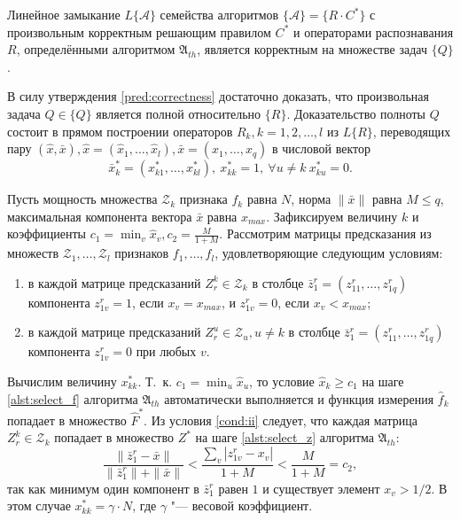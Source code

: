 \begin{Theorem}
	\label{th:correctness}
	Линейное замыкание $L\{\mathcal{A}\}$ семейства алгоритмов $\{\mathcal{A}\}=\{R{\cdot}C^*\}$ с произвольным корректным решающим правилом $C^*$ и операторами распознавания $R$, определёнными алгоритмом $\mathfrak A_{th}$, является корректным на множестве задач $\{Q\}$.
\end{Theorem}

\begin{Proof}
	В силу утверждения \ref{pred:correctness} достаточно доказать, что произвольная задача $Q\in\{Q\}$ является полной относительно $\{R\}$. Доказательство полноты $Q$ состоит в прямом построении операторов $R_k, k=1,2,\dots,l$ из $L\{R\}$, переводящих пару $(\hat{x},\bar{x}), \hat{x}=(\hat{x}_1,\dots,\hat{x}_l), \bar{x}=(x_1,\dots,x_q)$ в числовой вектор
	\begin{equation} \label{crit:fillness}
		\bar{x}_k^*=(x_{k1}^*,\dots,x_{kl}^*),\ x_{kk}^*=1,\ \forall u\neq k\ x_{ku}^*=0.
	\end{equation} 
	
	Пусть мощность множества $\mathcal Z_k$ признака $f_k$ равна $N$, норма $\|\bar x\|$ равна $M{\leqslant}q$, максимальная компонента вектора $\bar{x}$ равна $x_{max}$. Зафиксируем величину $k$ и коэффициенты $c_1=\min_v\hat x_v, c_2=\frac{M}{1+M}$. Рассмотрим матрицы предсказания из множеств $\mathcal{Z}_1,\dots,\mathcal{Z}_l$ признаков $f_1,\dots,f_l$, удовлетворяющие следующим условиям:
	
 \begin{enumerate}
	 	\item в каждой матрице предсказаний $Z_r^k\in\mathcal Z_k$ в столбце $\bar{z}_1^r=(z_{11}^r,\dots,z_{1q}^r)$ компонента $z_{1v}^r=1$, если $x_v=x_{max}$, и $z_{1v}^r=0$, если $x_v<x_{max}$; \label{cond:ii}
	 	
	 	\item в каждой матрице предсказаний $Z_r^u\in\mathcal Z_u, u\neq k$ в столбце $\bar{z}_1^r=(z_{11}^r,\dots,z_{1q}^r)$ компонента $z_{1v}^r=0$ при любых $v$. \label{cond:ij}
 \end{enumerate}
 
 Вычислим величину $x_{kk}^*$. Т.~к. $c_1=\min_u\hat x_u$, то условие $\hat x_k\geqslant c_1$ на шаге \ref{alst:select_f} алгоритма $\mathfrak A_{th}$ автоматически выполняется и функция измерения $\hat f_k$ попадает в множество $\hat F^*$. Из условия \ref{cond:ii} следует, что каждая матрица $Z_r^k\in\mathcal Z_k$ попадает в множество $Z^*$ на шаге \ref{alst:select_z} алгоритма $\mathfrak A_{th}$:
 \[
	 	\frac{\|\bar{z}_1^r-\bar{x}\|}{\|\bar{z}_1^r\|+\|\bar{x}\|}<\frac{\sum_v|z_{1v}^r-x_v|}{1+M}<\frac{M}{1+M}=c_2,
 \]
 так как минимум один компонент в $\bar{z}_1^r$ равен $1$ и существует элемент $x_v>1/2$. В этом случае $x_{kk}^*=\gamma{\cdot}N$, где $\gamma$ "--- весовой коэффициент.
 

\end{Proof}
